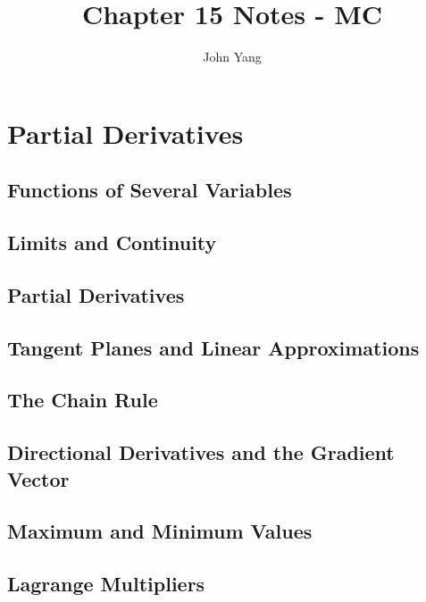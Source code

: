 \documentclass{article}
\title{Chapter 15 Notes - MC} %
\author{John Yang}
\begin{document}
    \maketitle
    \tableofcontents
    \section{Partial Derivatives} %
    \subsection{Functions of Several Variables} %
    \begin{outline}
        
    \end{outline}
    \subsection{Limits and Continuity}
    \begin{outline}
        
    \end{outline}
    \subsection{Partial Derivatives}
    \begin{outline}
        
    \end{outline}
    \subsection{Tangent Planes and Linear Approximations}
    \begin{outline}
        
    \end{outline}
    \subsection{The Chain Rule}
    \begin{outline}
        
    \end{outline}
    \subsection{Directional Derivatives and the Gradient Vector}
    \begin{outline}
        
    \end{outline}
    \subsection{Maximum and Minimum Values}
    \begin{outline}
        
    \end{outline}
    \subsection{Lagrange Multipliers}
    \begin{outline}
        
    \end{outline}
\end{document}
